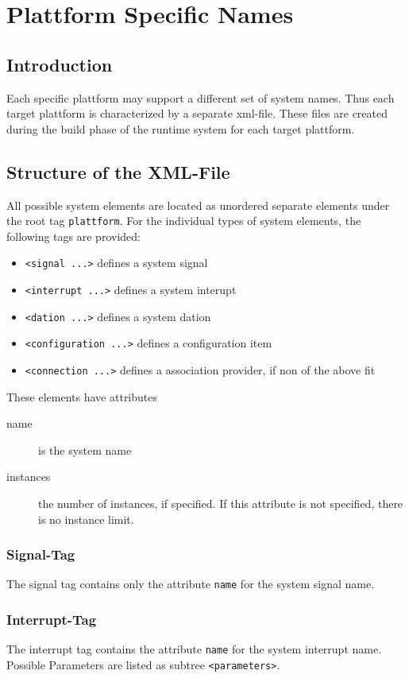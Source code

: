 \chapter{Plattform Specific Names}

\section{Introduction}
Each specific plattform may support a different set of system names.
Thus each target plattform is characterized by a separate xml-file.
These files are created during the build phase of the runtime system
for each target plattform.

\section{Structure of the XML-File}
All possible system elements are located as unordered separate 
elements under the root tag \verb|plattform|.
For the individual types of system elements, the following tags are
provided:
\begin{itemize}
\item \verb|<signal ...>| defines a system signal
\item \verb|<interrupt ...>| defines a system interupt
\item \verb|<dation ...>| defines a system dation
\item \verb|<configuration ...>| defines a configuration item
\item \verb|<connection ...>| defines a association provider, if 
   non of the above fit
\end{itemize}

These elements have attributes 
\begin{description}
\item [name] is the system name
\item [instances] the number of instances, if specified. If this attribute 
   is not specified, there is no instance limit.
\end{description}

\subsection{Signal-Tag}
The signal tag contains only the attribute \verb|name| for the
system signal name.

\subsection{Interrupt-Tag}
The interrupt tag contains the attribute \verb|name| for the
system interrupt name.
Possible Parameters are listed as subtree \verb|<parameters>|.

